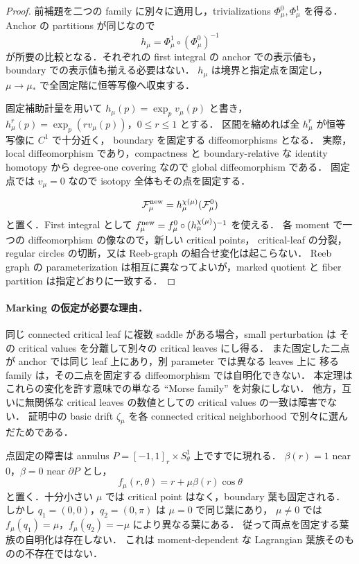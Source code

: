 \begin{proof}
前補題を二つの family に別々に適用し，trivializations
$\Phi^0_\mu,\Phi^1_\mu$ を得る．
Anchor の partitions が同じなので
\[
 h_\mu=\Phi^1_\mu\circ(\Phi^0_\mu)^{-1}
\]
が所要の比較となる．それぞれの first integral の anchor での表示値も，
boundary での表示値も揃える必要はない．
$h_\mu$ は境界と指定点を固定し，$\mu\to\mu_*$ で全固定階に恒等写像へ収束する．

固定補助計量を用いて $h_\mu(p)=\exp_p v_\mu(p)$ と書き，
$h^r_\mu(p)=\exp_p(rv_\mu(p))$，$0\le r\le1$ とする．
区間を縮めれば全 $h^r_\mu$ が恒等写像に $C^1$ で十分近く，
boundary を固定する diffeomorphisms となる．
実際，local diffeomorphism であり，compactness と boundary-relative な
identity homotopy から degree-one covering なので global diffeomorphism である．
固定点では $v_\mu=0$ なので isotopy 全体もその点を固定する．

\[
 \mathcal F^{\rm new}_\mu
   =h^{\chi(\mu)}_\mu(\mathcal F^0_\mu)
\]
と置く．First integral として
$f^{\rm new}_\mu=f^0_\mu\circ(h^{\chi(\mu)}_\mu)^{-1}$ を使える．
各 moment で一つの diffeomorphism の像なので，新しい critical points，
critical-leaf の分裂，regular circles の切断，又は Reeb-graph の組合せ変化は起こらない．
Reeb graph の parameterization は相互に異なってよいが，marked quotient と
fiber partition は指定どおりに一致する．
\end{proof}

\paragraph{Marking の仮定が必要な理由．}
同じ connected critical leaf に複数 saddle がある場合，small perturbation は
その critical values を分離して別々の critical leaves にし得る．
また固定した二点が anchor では同じ leaf 上にあり，別 parameter では異なる leaves 上に
移る family は，その二点を固定する diffeomorphism では自明化できない．
本定理はこれらの変化を許す意味での単なる ``Morse family'' を対象にしない．
他方，互いに無関係な critical leaves の数値としての critical values の一致は障害でない．
証明中の basic drift $\zeta_\mu$ を各 connected critical neighborhood で別々に選んだためである．

点固定の障害は annulus $P=[-1,1]_r\times S^1_\theta$ 上ですでに現れる．
$\beta(r)=1$ near $0$，$\beta=0$ near $\partial P$ とし，
\[
 f_\mu(r,\theta)=r+\mu\beta(r)\cos\theta
\]
と置く．十分小さい $\mu$ では critical point はなく，boundary 葉も固定される．
しかし $q_1=(0,0)$，$q_2=(0,\pi)$ は $\mu=0$ で同じ葉にあり，
$\mu\ne0$ では $f_\mu(q_1)=\mu$，$f_\mu(q_2)=-\mu$ により異なる葉にある．
従って両点を固定する葉族の自明化は存在しない．
これは moment-dependent な Lagrangian 葉族そのものの不存在ではない．

